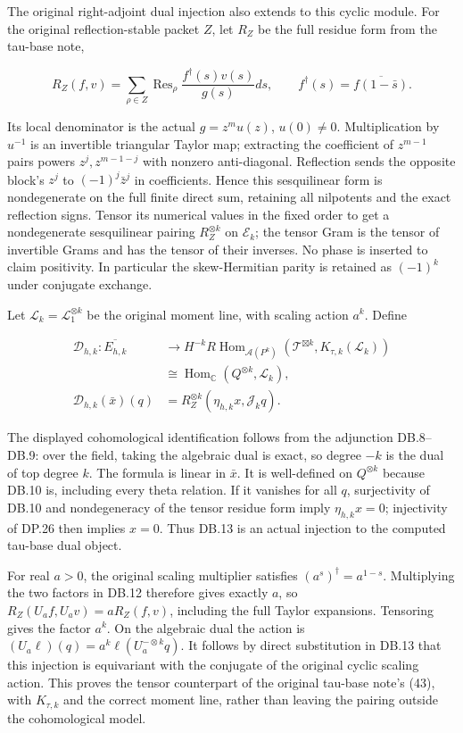 The original right-adjoint dual injection also extends to this cyclic module. For the original reflection-stable packet \(Z\), let \(R_Z\) be the full residue form from the tau-base note,

\[
R_Z(f,v)=\sum_{\rho\in Z}\operatorname{Res}_{\rho}
 \frac{f^\dagger(s)v(s)}{g(s)}ds,
\qquad f^\dagger(s)=\overline{f(1-\bar s)}.
\tag{DB.12}
\]

Its local denominator is the actual \(g=z^m u(z)\), \(u(0)\ne0\). Multiplication by \(u^{-1}\) is an invertible triangular Taylor map; extracting the coefficient of \(z^{m-1}\) pairs powers \(z^j,z^{m-1-j}\) with nonzero anti-diagonal. Reflection sends the opposite block's \(z^j\) to \((-1)^j\bar z^j\) in coefficients. Hence this sesquilinear form is nondegenerate on the full finite direct sum, retaining all nilpotents and the exact reflection signs. Tensor its numerical values in the fixed order to get a nondegenerate sesquilinear pairing \(R_Z^{\otimes k}\) on \(\mathcal E_k\); the tensor Gram is the tensor of invertible Grams and has the tensor of their inverses. No phase is inserted to claim positivity. In particular the skew-Hermitian parity is retained as \((-1)^k\) under conjugate exchange.

Let \(\mathcal L_k=\mathcal L_1^{\otimes k}\) be the original moment line, with scaling action \(a^k\). Define

\[
\begin{aligned}
\mathcal D_{h,k}:\overline{E_{h,k}}&\longrightarrow
H^{-k}R\operatorname{Hom}_{\mathcal A(P^k)}
 (\mathcal T^{\boxtimes k},K_{\tau,k}(\mathcal L_k))\\
&\cong\operatorname{Hom}_{\mathbb C}(Q^{\otimes k},\mathcal L_k),\\
\mathcal D_{h,k}(\bar x)(q)&=
R_Z^{\otimes k}(\eta_{h,k}x,\mathcal J_k q).
\end{aligned}
\tag{DB.13}
\]

The displayed cohomological identification follows from the adjunction DB.8--DB.9: over the field, taking the algebraic dual is exact, so degree \(-k\) is the dual of top degree \(k\). The formula is linear in \(\bar x\). It is well-defined on \(Q^{\otimes k}\) because DB.10 is, including every theta relation. If it vanishes for all \(q\), surjectivity of DB.10 and nondegeneracy of the tensor residue form imply \(\eta_{h,k}x=0\); injectivity of DP.26 then implies \(x=0\). Thus DB.13 is an actual injection to the computed tau-base dual object.

For real \(a>0\), the original scaling multiplier satisfies \((a^s)^\dagger=a^{1-s}\). Multiplying the two factors in DB.12 therefore gives exactly \(a\), so \(R_Z(U_af,U_av)=aR_Z(f,v)\), including the full Taylor expansions. Tensoring gives the factor \(a^k\). On the algebraic dual the action is \((U_a\ell)(q)=a^k\ell(U_a^{-\otimes k}q)\). It follows by direct substitution in DB.13 that this injection is equivariant with the conjugate of the original cyclic scaling action. This proves the tensor counterpart of the original tau-base note's (43), with \(K_{\tau,k}\) and the correct moment line, rather than leaving the pairing outside the cohomological model.

